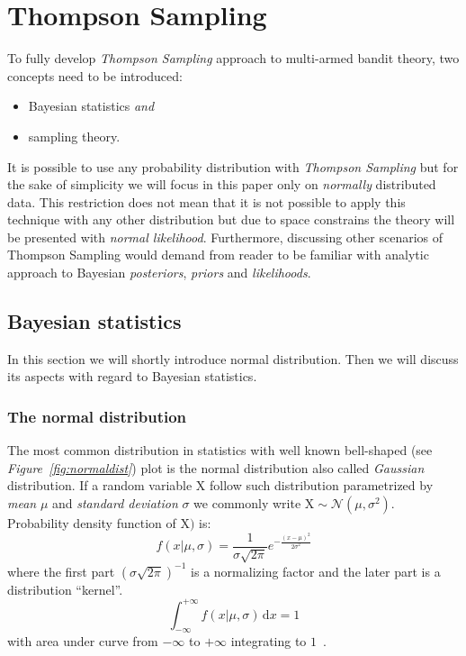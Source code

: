 \documentclass[12pt, a4paper, pdflatex]{report}
\begin{document}
\section{Thompson Sampling\label{sec:thompsonsampling}}
To fully develop \emph{Thompson Sampling} approach to multi-armed bandit theory, two concepts need to be introduced:
\begin{itemize}
\item Bayesian statistics \emph{and}
\item sampling theory.
\end{itemize}
It is possible to use any probability distribution with \emph{Thompson Sampling} but for the sake of simplicity we will focus in this paper only on \emph{normally} distributed data. This restriction does not mean that it is not possible to apply this technique with any other distribution but due to space constrains the theory will be presented with \emph{normal likelihood}. Furthermore, discussing other scenarios of Thompson Sampling would demand from reader to be familiar with analytic approach to Bayesian \emph{posteriors}, \emph{priors} and \emph{likelihoods}.

\subsection{Bayesian statistics}
In this section we will shortly introduce normal distribution. Then we will discuss its aspects with regard to Bayesian statistics.

\subsubsection{The normal distribution}
The most common distribution in statistics with well known bell-shaped (see \emph{Figure~\ref{fig:normaldist}}) plot is the normal distribution also called \emph{Gaussian} distribution. If a random variable $\mathrm{X}$ follow such distribution parametrized by \emph{mean} $\mu$ and \emph{standard deviation} $\sigma$ we commonly write $\mathrm{X} \sim \mathcal{N}\left( \mu, \sigma^2 \right)$. Probability density function of $\mathrm{X})$ is:
$$
f \left(x | \mu, \sigma \right) = \frac{1}{\sigma \sqrt{2 \pi }} e^{- \frac{ {\left (  x - \mu \right )}^2 }{2 \sigma^2} }
$$
where the first part ${\left( \sigma \sqrt{2 \pi } \right)}^{-1}$ is a normalizing factor and the later part is a distribution ``kernel''.
$$
\int_{-\infty}^{+\infty} \! f \left(x | \mu, \sigma \right) \, \mathrm{d}x = 1
$$
with area under curve from $-\infty$ to $+\infty$ integrating to $1$~\cite{rice1995mathematical}.
\end{document}
